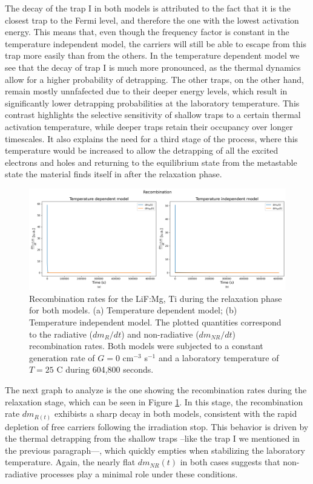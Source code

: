 The decay of the trap I in both models is attributed to the fact that it is the closest trap to the Fermi level, and therefore the one with the lowest activation energy. This means that, even though the frequency factor is constant in the temperature independent model, the carriers will still be able to escape from this trap more easily than from the others. In the temperature dependent model we see that the decay of trap I is much more pronounced, as the thermal dynamics allow for a higher probability of detrapping. The other traps, on the other hand, remain mostly unnfafected due to their deeper energy levels, which result in significantly lower detrapping probabilities at the laboratory temperature. This contrast highlights the selective sensitivity of shallow traps to a certain thermal activation temperature, while deeper traps retain their occupancy over longer timescales. It also explains the need for a third stage of the process, where this temperature would be increased to allow the detrapping of all the excited electrons and holes and returning to the equilibrium state from the metastable state the material finds itself in after the relaxation phase.

\begin{figure}[H]
    \centering
    \includegraphics[width=\textwidth]{Images/Relaxation Recombination.png}
    \caption{Recombination rates for the LiF:Mg, Ti during the relaxation phase for both models. (a) Temperature dependent model; (b) Temperature independent model. The plotted quantities correspond to the radiative ($dm_R/dt$) and non-radiative ($dm_{NR}/dt$) recombination rates. Both models were subjected to a constant generation rate of $G = 0$ cm$^{-3}$ s$^{-1}$ and a laboratory temperature of $T = 25$ \textdegree C during 604,800 seconds.}
    \label{fig:relaxation_recombination}
\end{figure}

\vspace{10pt}

The next graph to analyze is the one showing the recombination rates during the relaxation stage, which can be seen in Figure \ref{fig:relaxation_recombination}. In this stage, the recombination rate $dm_{R(t)}$ exhibists a sharp decay in both models, consistent with the rapid depletion of free carriers following the irradiation stop. This behavior is driven by the thermal detrapping from the shallow traps --like the trap I we mentioned in the previous paragraph---, which quickly empties when stabilizing the laboratory temperature. Again, the nearly flat $dm_{NR}(t)$ in both cases suggests that non-radiative processes play a minimal role under these conditions.

